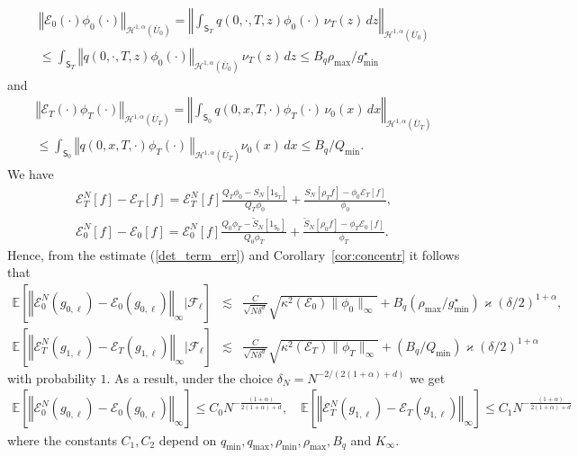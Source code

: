 \documentclass[a4paper,11pt]{amsart}
\theoremstyle{plain}
\theoremstyle{remark}
\begin{document}
\begin{multline*}
\left\Vert \mathcal{E}_{0}(\cdot)\phi_{0}(\cdot)\right\Vert _{\mathcal{H}%
^{1,\alpha}(\overline{U}_{0})}=\left\Vert \int_{\mathsf{S}_{T}}q(0,\cdot
,T,z)\phi_{0}(\cdot)\,\nu_{T}(z)\,dz\right\Vert _{\mathcal{H}^{1,\alpha
}(\overline{U}_{0})}\\
\leq\int_{\mathsf{S}_{T}}\left\Vert q(0,\cdot,T,z)\phi_{0}(\cdot)\right\Vert
_{\mathcal{H}^{1,\alpha}(\overline{U}_{0})}\,\nu_{T}(z)\,dz\leq B_{q}%
\rho_{\max}/g_{\min}^{\star}%
\end{multline*}
and
\begin{multline*}
\left\Vert \mathcal{E}_{T}(\cdot)\phi_{T}(\cdot)\right\Vert _{\mathcal{H}%
^{1,\alpha}(\overline{U}_{T})}=\left\Vert \int_{\mathsf{S}_{0}}q(0,x,T,\cdot
)\phi_{T}(\cdot)\,\nu_{0}(x)\,dx\right\Vert _{\mathcal{H}^{1,\alpha}%
(\overline{U}_{T})}\\
\leq\int_{\mathsf{S}_{0}}\left\Vert q(0,x,T,\cdot)\phi_{T}(\cdot)\,\right\Vert
_{\mathcal{H}^{1,\alpha}(\overline{U}_{T})}\nu_{0}(x)\,dx\leq B_{q}/Q_{\min}.
\end{multline*}
We have
\begin{eqnarray*}
\mathcal{E}_{T}^{N}[f]-\mathcal{E}_{T}[f]=\mathcal{E}_{T}^{N}[f]\frac{Q_{T}\phi_{0}-S_{N}[1_{\mathsf{S}_{T}}]}{Q_{T}\phi_{0}}+\frac{S_{N}[\rho_{T}f]-\phi_{0}\mathcal{E}_{T}[f]}{\phi_{0}},
\\
\mathcal{E}_{0}^{N}[f]-\mathcal{E}_{0}[f]=\mathcal{E}_{0}^{N}[f]\frac{Q_{0}\phi_{T}-\widetilde{S}_{N}[1_{\mathsf{S}_{0}}]}{Q_{0}\phi_{T}}+\frac{\widetilde{S}_{N}[\rho_{0}f]-\phi_{T}\mathcal{E}_{0}[f]}{\phi_{T}}.
\end{eqnarray*}
Hence, from the estimate (\ref{det_term_err}) and Corollary~\ref{cor:concentr} it follows that
\begin{eqnarray*}
\mathbb{E}\left[\left\Vert \mathcal{E}_{0}^{N}(g_{0,\ell})-\mathcal{E}_{0}(g_{0,\ell})\right\Vert _{\infty}|\mathcal{F}_\ell\right]&\lesssim & 
\frac{C}{\sqrt{N\delta^{d}}}\sqrt{\kappa^{2}(\mathcal{E}_{0})\|\phi_0\|_{\infty}}+B_q(\rho_{\max}/g^\star_{\min})\varkappa(\delta/2)^{1+\alpha},
\\
\mathbb{E}\left[\left\Vert \mathcal{E}_{T}%
^{N}(g_{1,\ell})-\mathcal{E}_{T}(g_{1,\ell})\right\Vert_{\infty}|\mathcal{F}_\ell\right]&\lesssim & \frac{C}{\sqrt{N\delta^{d}}}\sqrt{\kappa^{2}(\mathcal{E}_{T})\|\phi_T\|_{\infty}}+(B_q/Q_{\min})\varkappa(\delta/2)^{1+\alpha}
\end{eqnarray*}
with probability $1.$
As a result, under the choice \(\delta_{N} =  N^{-2/(2(1+\alpha)+d)} \)
we get
\begin{eqnarray*}
\mathbb{E}\left[\left\Vert \mathcal{E}_{0}^{N}(g_{0,\ell})-\mathcal{E}_{0}(g_{0,\ell})\right\Vert _{\infty}\right]\leq C_0 N^{-\frac{(1+\alpha)}{2(1+\alpha)+d}},\quad \mathbb{E}\left[\left\Vert \mathcal{E}_{T}^{N}(g_{1,\ell})-\mathcal{E}_{T}(g_{1,\ell})\right\Vert _{\infty}\right]\leq C_1 N^{-\frac{(1+\alpha)}{2(1+\alpha)+d}}
\end{eqnarray*}
where the constants \(C_1,C_2\) depend on \(q_{\min},q_{\max},\rho_{\min},\rho_{\max},B_q\) and \(K_\infty\).
\end{document}
